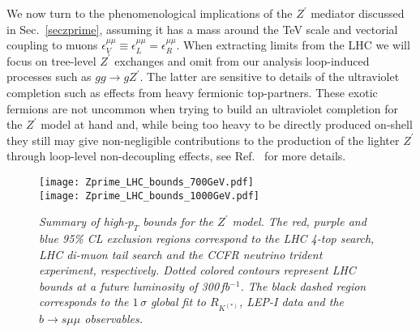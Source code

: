 \documentclass[aps,twocolumn,showpacs,preprintnumbers,amsmath,amssymb,floatfix,nofootinbib]{revtex4-1}
\newcommand{\invfb}{fb$^{-1}$}
\begin{document}
We now turn to the phenomenological implications of the $Z^\prime$ mediator discussed in Sec.~\ref{seczprime}, assuming it has a mass around the TeV scale and vectorial coupling to muons $\epsilon_V^{\mu\mu}\equiv\epsilon_L^{\mu\mu}=\epsilon_R^{\mu\mu}$.  When extracting limits from the LHC we will focus on tree-level $Z^\prime$ exchanges and omit from our analysis loop-induced processes such as $gg \to g Z^{\prime}$. The latter are sensitive to details of the ultraviolet completion such as effects from heavy fermionic top-partners. These exotic fermions are not uncommon when trying to build an ultraviolet completion for the $Z^\prime$ model at hand and, while being too heavy to be directly produced on-shell they still may give non-negligible contributions to the production of the lighter $Z^\prime$ through loop-level non-decoupling effects, see Ref.~\cite{Kamenik:2017tnu,Fox:2018ldq} for more details. 
%
\begin{figure}[t]
\begin{center}{
\texttt{[image: Zprime\_LHC\_bounds\_700GeV.pdf]}\\ \vspace{0.3cm}
\texttt{[image: Zprime\_LHC\_bounds\_1000GeV.pdf]}\\
\caption{\label{fig:ZprimeLHC} \textit{Summary of high-$p_T$ bounds for the $Z^\prime$ model. The red, purple and blue 95\% CL exclusion regions correspond to the LHC 4-top search, LHC di-muon tail search and the CCFR neutrino trident experiment, respectively. Dotted colored contours represent LHC bounds at a future luminosity of 300\,\invfb. The black dashed region corresponds to the $1\,\sigma$ global fit to $R_{K^{(*)}}$, LEP-I data and the $b\to s\mu\mu$ observables.} } }
\end{center}
\end{figure}
\end{document}
